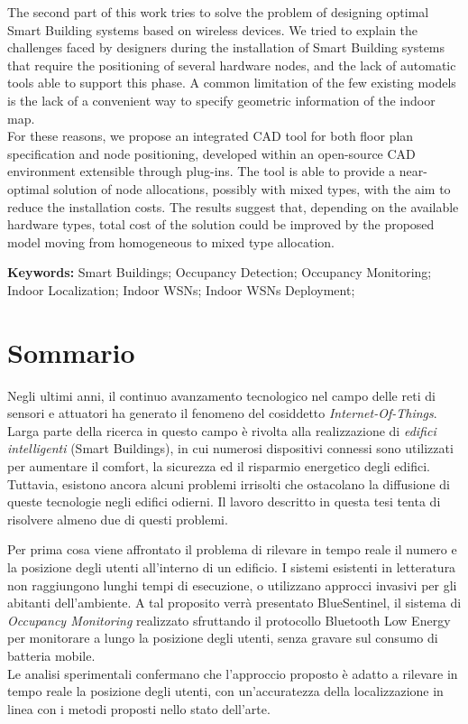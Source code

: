 The second part of this work tries to solve the problem of designing optimal Smart Building systems based on wireless devices. We tried to explain the challenges faced by designers during the installation of Smart Building systems that require the positioning of several hardware nodes, and the lack of automatic tools able to support this phase. A common limitation of the few existing models is the lack of a convenient way to specify geometric information of the indoor map.\\
For these reasons, we propose an integrated CAD tool for both floor plan specification and node positioning, developed within an \mbox{open-source} CAD environment extensible through plug-ins. The tool is able to provide a near-optimal solution of node allocations, possibly with mixed types, with the aim to reduce the installation costs. The results suggest that, depending on the available hardware types, total cost of the solution could be improved by the proposed model moving from homogeneous to mixed type allocation.

\medskip
%
\noindent \textbf{Keywords:} 
Smart Buildings; Occupancy Detection; Occupancy Monitoring; Indoor Localization; Indoor WSNs; Indoor WSNs Deployment;
%
\clearpage
%
%
%
%
%
\chapter*{Sommario}
%
Negli ultimi anni, il continuo avanzamento tecnologico nel campo delle reti di sensori e attuatori ha generato il fenomeno del cosiddetto \emph{Internet-Of-Things}. Larga parte della ricerca in questo campo è rivolta alla realizzazione di \emph{edifici intelligenti} (Smart Buildings), in cui numerosi dispositivi connessi sono utilizzati per aumentare il comfort, la sicurezza ed il risparmio energetico degli edifici. Tuttavia, esistono ancora alcuni problemi irrisolti che ostacolano la diffusione di queste tecnologie negli edifici odierni. Il lavoro descritto in questa tesi tenta di risolvere almeno due di questi problemi.

Per prima cosa viene affrontato il problema di rilevare in tempo reale il numero e la posizione degli utenti all'interno di un edificio. I sistemi esistenti in letteratura non raggiungono lunghi tempi di esecuzione, o utilizzano approcci invasivi per gli abitanti dell'ambiente.
A tal proposito verrà presentato BlueSentinel, il sistema di \emph{Occupancy Monitoring} realizzato sfruttando il protocollo Bluetooth Low Energy per monitorare a lungo la posizione degli utenti, senza gravare sul consumo di batteria mobile.\\
Le analisi sperimentali confermano che l'approccio proposto è adatto a rilevare in tempo reale la posizione degli utenti, con un'accuratezza della localizzazione in linea con i metodi proposti nello stato dell'arte.

